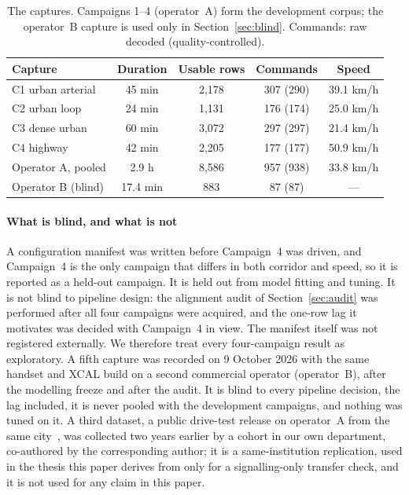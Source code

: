 \documentclass[5p,times,twocolumn]{elsarticle}
\begin{document}
\begin{table}[t]
\centering
\caption{The captures. Campaigns 1--4 (operator~A) form the development corpus; the operator~B capture is used only in Section~\ref{sec:blind}. Commands: raw decoded (quality-controlled).}
\label{tab:corpus}
\footnotesize
\setlength{\tabcolsep}{3pt}
\begin{tabularx}{\linewidth}{X c c c c}
\toprule
\textbf{Capture} & \textbf{Duration} & \textbf{Usable rows} & \textbf{Commands} & \textbf{Speed} \\
\midrule
C1 urban arterial & 45 min & 2,178 & 307 (290) & 39.1 km/h \\
C2 urban loop & 24 min & 1,131 & 176 (174) & 25.0 km/h \\
C3 dense urban & 60 min & 3,072 & 297 (297) & 21.4 km/h \\
C4 highway & 42 min & 2,205 & 177 (177) & 50.9 km/h \\
Operator A, pooled & 2.9 h & 8,586 & 957 (938) & 33.8 km/h \\
\midrule
Operator B (blind) & 17.4 min & 883 & 87 (87) & --- \\
\bottomrule
\end{tabularx}
\end{table}

\paragraph{What is blind, and what is not} A configuration manifest was written before Campaign~4 was driven, and Campaign~4 is the only campaign that differs in both corridor and speed, so it is reported as a held-out campaign. It is held out from model fitting and tuning. It is not blind to pipeline design: the alignment audit of Section~\ref{sec:audit} was performed after all four campaigns were acquired, and the one-row lag it motivates was decided with Campaign~4 in view. The manifest itself was not registered externally. We therefore treat every four-campaign result as exploratory. A fifth capture was recorded on 9 October 2026 with the same handset and XCAL build on a second commercial operator (operator~B), after the modelling freeze and after the audit. It is blind to every pipeline decision, the lag included, it is never pooled with the development campaigns, and nothing was tuned on it. A third dataset, a public drive-test release on operator~A from the same city~\cite{ref38}, was collected two years earlier by a cohort in our own department, co-authored by the corresponding author; it is a same-institution replication, used in the thesis this paper derives from only for a signalling-only transfer check, and it is not used for any claim in this paper.
\end{document}
